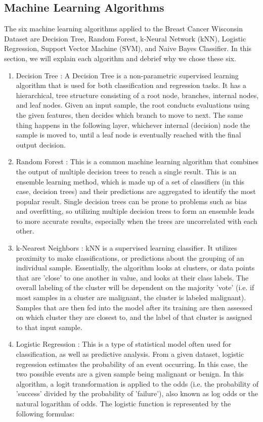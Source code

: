\documentclass[conference]{IEEEtran}
\begin{document}
\subsection{Machine Learning Algorithms}
The six machine learning algorithms applied to the Breast Cancer Wisconsin Dataset are Decision Tree, Random Forest, k-Neural Network (kNN), Logistic Regression, Support Vector Machine (SVM), and Naive Bayes Classifier. In this section, we will explain each algorithm and debrief why we chose these six. 
\begin{enumerate}
\item Decision Tree : A Decision Tree is a non-parametric supervised learning algorithm that is used for both classification and regression tasks. It has a hierarchical, tree structure consisting of a root node, branches, internal nodes, and leaf nodes. Given an input sample, the root conducts evaluations using the given features, then decides which branch to move to next. The same thing happens in the following layer, whichever internal (decision) node the sample is moved to, until a leaf node is eventually reached with the final output decision. 
\item Random Forest : This is a common machine learning algorithm that combines the output of multiple decision trees to reach a single result. This is an ensemble learning method, which is made up of a set of classifiers (in this case, decision trees) and their predictions are aggregated to identify the most popular result. Single decision trees can be prone to problems such as bias and overfitting, so utilizing multiple decision trees to form an ensemble leads to more accurate results, especially when the trees are uncorrelated with each other.
\item k-Nearest Neighbors : kNN is a supervised learning classifier. It utilizes proximity to make classifications, or predictions about the grouping of an individual sample. Essentially, the algorithm looks at clusters, or data points that are 'close' to one another in value, and looks at their class labels. The overall labeling of the cluster will be dependent on the majority 'vote' (i.e. if most samples in a cluster are malignant, the cluster is labeled malignant). Samples that are then fed into the model after its training are then assessed on which cluster they are closest to, and the label of that cluster is assigned to that input sample.
\item Logistic Regression : This is a type of statistical model often used for classification, as well as predictive analysis. From a given dataset, logistic regression estimates the probability of an event occurring. In this case, the two possible events are a given sample being malignant or benign. In this algorithm, a logit transformation is applied to the odds (i.e. the probability of 'success' divided by the probability of 'failure'), also known as log odds or the natural logarithm of odds. The logistic function is represented by the following formulas:

\end{enumerate}
\end{document}
